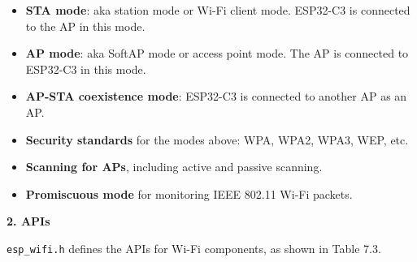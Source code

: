 \documentclass[a4paper,12pt]{book}
\begin{document}
\begin{itemize}[noitemsep]
    \item \textbf{STA mode}: aka station mode or Wi-Fi client mode. ESP32-C3 is connected to the AP in this mode.
    \item \textbf{AP mode}: aka SoftAP mode or access point mode. The AP is connected to ESP32-C3 in this mode.
    \item \textbf{AP-STA coexistence mode}: ESP32-C3 is connected to another AP as an AP.
    \item \textbf{Security standards} for the modes above: WPA, WPA2, WPA3, WEP, etc.
    \item \textbf{Scanning for APs}, including active and passive scanning.
    \item \textbf{Promiscuous mode} for monitoring IEEE 802.11 Wi-Fi packets.
\end{itemize}

\textbf{2. APIs}

\verb|esp_wifi.h| defines the APIs for Wi-Fi components, as shown in Table 7.3.
\end{document}
